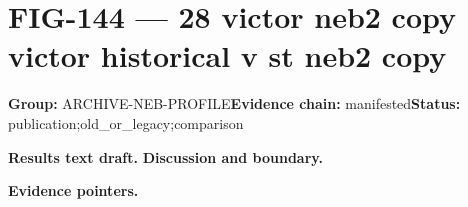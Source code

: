 \clearpage
\section{FIG-144 --- 28 victor neb2 copy victor historical v st neb2 copy}
\label{figpage:fig-144}
\textbf{Group:} ARCHIVE-NEB-PROFILE\quad \textbf{Evidence chain:} manifested\quad \textbf{Status:} publication;old\_or\_legacy;comparison

\textbf{Results text draft.} 
\textbf{Discussion and boundary.} 


\textbf{Evidence pointers.}



\vfill
